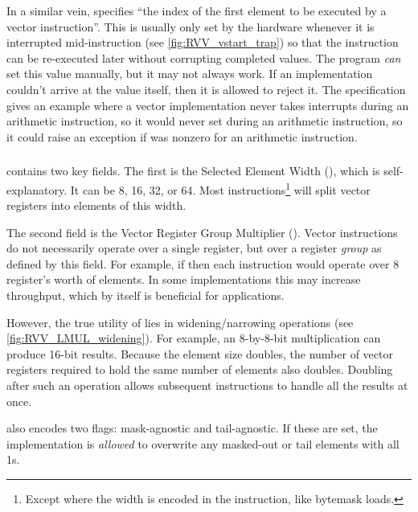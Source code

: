 In a similar vein,  specifies \enquote{the index of the first element to be executed by a vector instruction}.
This is usually only set by the hardware whenever it is interrupted mid-instruction (see \cref{fig:RVV_vstart_trap}) so that the instruction can be re-executed later without corrupting completed values.
The program \emph{can} set this value manually, but it may not always work.
If an implementation couldn't arrive at the value itself, then it is allowed to reject it.
The specification gives an example where a vector implementation never takes interrupts during an arithmetic instruction, so it would never set  during an arithmetic instruction, so it could raise an exception if  was nonzero for an arithmetic instruction.



\subsubsection{}
 contains two key fields.
The first is the Selected Element Width (), which is self-explanatory.
It can be 8, 16, 32, or 64.
Most instructions\footnote{Except where the width is encoded in the instruction, like bytemask loads.} will split vector registers into elements of this width.

The second field is the Vector Register Group Multiplier ().
Vector instructions do not necessarily operate over a single register, but over a register \emph{group} as defined by this field.
For example, if  then each instruction would operate over 8 register's worth of elements.
In some implementations this may increase throughput, which by itself is beneficial for applications.



However, the true utility of  lies in widening/narrowing operations (see \cref{fig:RVV_LMUL_widening}).
For example, an 8-by-8-bit multiplication can produce 16-bit results.
Because the element size doubles, the number of vector registers required to hold the same number of elements also doubles.
Doubling  after such an operation allows subsequent instructions to handle all the results at once.

 also encodes two flags: mask-agnostic and tail-agnostic.
If these are set, the implementation is \emph{allowed} to overwrite any masked-out or tail elements with all 1s.

